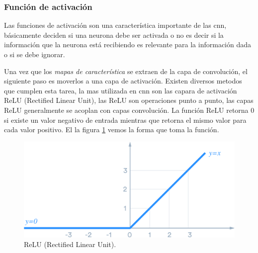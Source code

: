 \subsubsection{Función de activación}\label{sub:relu}
Las funciones de activación son una característica  importante de las \ac{cnn}, básicamente deciden si una neurona debe ser activada o no es decir si la información que la neurona está recibiendo es relevante para la información dada o si se debe ignorar.

Una vez que los \textit{mapas de característica} se extraen de la capa de convolución, el siguiente paso es moverlos a una capa de activación. Existen diversos metodos que cumplen esta tarea, la mas utilizada en  \ac{cnn} son las capara de activación ReLU (Rectified Linear Unit), las  ReLU son operaciones punto a punto, las capas ReLU generalmente se acoplan con capas convolución. La función ReLU retorna 0 si existe un valor negativo de entrada mientras que retorna el mismo valor para cada valor positivo. El la figura  \ref{Fig:relu} vemos la forma que toma la función.

\begin{figure}[H]
 \centering
  \includegraphics[scale=0.25,keepaspectratio=true,clip=true]{imagenes/MarcoTeorico/ReLU_1.png}
  \caption{ReLU (Rectified Linear Unit).}%
  \label{Fig:relu}
\end{figure}



